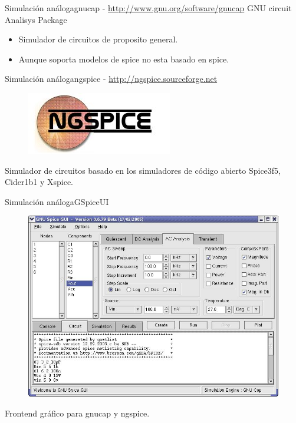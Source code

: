 \documentclass{beamer}
\begin{document}
\begin{frame}{Simulación análoga}{\alert{gnucap} - \url{http://www.gnu.org/software/gnucap}}
  GNU circuit Analisys Package
  \begin{itemize}
  \item Simulador de circuitos de proposito general.
  \item Aunque soporta modelos de spice no esta basado en spice.
  \end{itemize}
\end{frame}

\begin{frame}{Simulación análoga}{\alert{ngspice} - \url{http://ngspice.sourceforge.net}}
  \begin{figure}[!h]
    \centering
    \includegraphics[scale=0.5]{img/nglogo.jpg}
  \end{figure}
  Simulador de circuitos basado en los simuladores de código abierto Spice3f5, Cider1b1 y Xspice.
\end{frame}

\begin{frame}{Simulación análoga}{GSpiceUI}
  \begin{figure}[!h]
    \centering
    \includegraphics[scale=0.3]{img/GSpiceUI.jpg}
  \end{figure}
  Frontend gráfico para gnucap y ngspice.
\end{frame}
\end{document}
